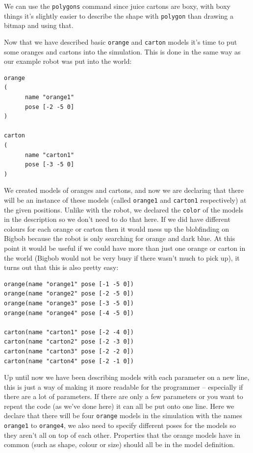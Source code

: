\documentclass[a4paper]{article}
\begin{document}
We can use the \verb|polygons| command since juice cartons are boxy, with boxy things it's slightly easier to describe the shape with \verb|polygon| than drawing a bitmap and using that.\newline

Now that we have described basic \verb|orange| and \verb|carton| models it's time to put some oranges and cartons into the simulation. This is done in the same way as our example robot was put into the world:
\begin{verbatim}
orange
(
      name "orange1" 
      pose [-2 -5 0]
)

carton
(
      name "carton1" 
      pose [-3 -5 0]
)
\end{verbatim}
We created models of oranges and cartons, and now we are declaring that there will be an instance of these models (called \verb|orange1| and \verb|carton1| respectively) at the given positions. Unlike with the robot, we declared the \verb|color| of the models in the description so we don't need to do that here. If we did have different colours for each orange or carton then it would mess up the blobfinding on Bigbob because the robot is only searching for orange and dark blue.
At this point it would be useful if we could have more than just one orange or carton in the world (Bigbob would not be very busy if there wasn't much to pick up), it turns out that this is also pretty easy:
\begin{verbatim}
orange(name "orange1" pose [-1 -5 0])
orange(name "orange2" pose [-2 -5 0])
orange(name "orange3" pose [-3 -5 0])
orange(name "orange4" pose [-4 -5 0])

carton(name "carton1" pose [-2 -4 0])
carton(name "carton2" pose [-2 -3 0])
carton(name "carton3" pose [-2 -2 0])
carton(name "carton4" pose [-2 -1 0])
\end{verbatim}

Up until now we have been describing models with each parameter on a new line, this is just a way of making it more readable for the programmer -- especially if there are a lot of parameters. If there are only a few parameters or you want to repeat the code (as we've done here) it can all be put onto one line. Here we declare that there will be four \verb|orange| models in the simulation with the names \verb|orange1| to \verb|orange4|, we also need to specify different poses for the models so they aren't all on top of each other. Properties that the orange models have in common (such as shape, colour or size) should all be in the model definition. 
\end{document}
